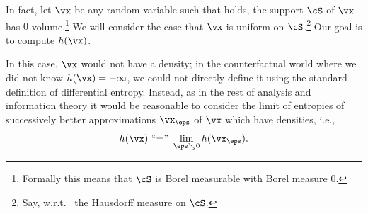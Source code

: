 \documentclass[../../book-main.tex]{subfiles}
\begin{document}
In fact, let \(\vx\) be any random variable such that
 holds, the support
\(\cS\) of \(\vx\) has \(0\) volume.\footnote{Formally this means
that \(\cS\) is Borel measurable with Borel measure \(0\).} We will
consider the case that \(\vx\) is uniform on \(\cS\).\footnote{Say,
w.r.t.~ the Hausdorff measure on \(\cS\).} Our goal is to compute \(h(\vx)\).

In this case, \(\vx\) would not have a density; in the counterfactual
world where we did not know \(h(\vx) = -\infty\), we could not
directly define it using the standard definition of differential
entropy. Instead, as in the rest of analysis and information theory
it would be reasonable to consider the limit of entropies of
successively better approximations \(\vx_{\eps}\) of \(\vx\) which
have densities, i.e.,
\begin{equation}
    h(\vx)\ \text{``=''}\ \lim_{\eps \searrow 0}h(\vx_{\eps}).
\end{equation}
\end{document}
